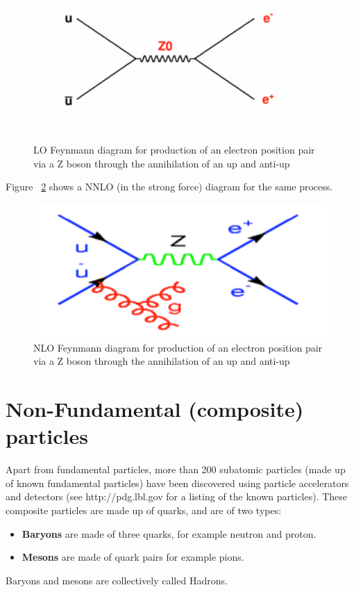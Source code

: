 \begin{figure}[h]
\centering\includegraphics[scale=0.5]{./ElementaryParticles/Pictures/fig8.pdf}
\caption{LO Feynmann diagram for production of an electron position pair via a Z boson through the annihilation of an up and anti-up}
\label{fig:fig8}
\end{figure}
 

Figure ~\ref{fig:fig9} shows a NNLO (in the strong force) diagram for the same process.
 
\begin{figure}[h]
\centering\includegraphics[scale=0.5]{./ElementaryParticles/Pictures/fig9.pdf}
\caption{NLO Feynmann diagram for production of an electron position pair via a Z boson through the annihilation of an up and anti-up}
\label{fig:fig9}
\end{figure}


\section{Non-Fundamental (composite) particles}
Apart from fundamental particles, more than 200 subatomic particles (made up of known fundamental particles) have been discovered using particle accelerators and detectors (see http://pdg.lbl.gov for a listing of the known particles).  These composite particles are made up of quarks, and are of two types:
\begin{itemize}
\item {\bf Baryons} are made of three quarks, for example neutron and proton.
\item {\bf Mesons} are made of quark pairs for example pions.
\end{itemize}
Baryons and mesons are collectively called Hadrons.




